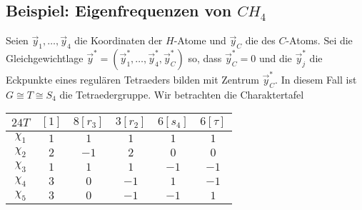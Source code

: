 \subsection{Beispiel: Eigenfrequenzen von $CH_4$}

Seien $\vec{y}_1,\dots,\vec{y}_4$ die Koordinaten der $H$-Atome und
$\vec{y}_C$ die des $C$-Atoms. Sei die Gleichgewichtlage
$\vec{y}^\ast = (\vec{y}_1^\ast , \dots,\vec{y}_4^\ast , \vec{y}_C^\ast)$
so, dass $\vec{y}_C^\ast = 0$ und die $\vec{y}_j^\ast$ die Eckpunkte eines
regulären Tetraeders bilden mit Zentrum $\vec{y}_C^\ast$. In diesem Fall ist
$G \cong T \cong S_4$ die Tetraedergruppe. Wir betrachten die Charaktertafel

\begin{table}[h]
    \centering
    \begin{tabular}{c|c c c c c}
        $24 T$ & $[1]$ & $8 [r_3]$ & $3 [r_2]$ & $6 [s_4]$ & $6 [\tau]$ \\ \hline
        $\chi_1$ & $1$ & $1$ & $1$ & $1$ & $1$ \\
        $\chi_2$ & $2$ & $-1$ & $2$ & $0$ & $0$ \\
        $\chi_3$ & $1$ & $1$ & $1$ & $-1$ & $-1$ \\
        $\chi_4$ & $3$ & $0$ & $-1$ & $1$ & $-1$ \\
        $\chi_5$ & $3$ & $0$ & $-1$ & $-1$ & $1$    
    \end{tabular}
\end{table}


